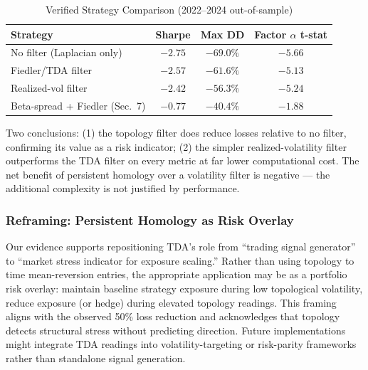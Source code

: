 \begin{table}[H]
\centering
\caption{Verified Strategy Comparison (2022--2024 out-of-sample)}
\label{tab:verified-comparison}
\begin{tabular}{@{}lccc@{}}
\toprule
\textbf{Strategy} & \textbf{Sharpe} & \textbf{Max DD} & \textbf{Factor $\alpha$ t-stat} \\
\midrule
No filter (Laplacian only)      & $-2.75$ & $-69.0\%$ & $-5.66$ \\
Fiedler/TDA filter              & $-2.57$ & $-61.6\%$ & $-5.13$ \\
Realized-vol filter             & $-2.42$ & $-56.3\%$ & $-5.24$ \\
Beta-spread + Fiedler (Sec.\ 7) & $-0.77$ & $-40.4\%$ & $-1.88$ \\
\bottomrule
\end{tabular}
\end{table}

Two conclusions: (1) the topology filter does reduce losses relative to no filter, confirming its value as a risk indicator; (2) the simpler realized-volatility filter outperforms the TDA filter on every metric at far lower computational cost. The net benefit of persistent homology over a volatility filter is negative --- the additional complexity is not justified by performance.

\subsubsection{Reframing: Persistent Homology as Risk Overlay}

Our evidence supports repositioning TDA's role from ``trading signal generator'' to ``market stress indicator for exposure scaling.'' Rather than using topology to time mean-reversion entries, the appropriate application may be as a portfolio risk overlay: maintain baseline strategy exposure during low topological volatility, reduce exposure (or hedge) during elevated topology readings. This framing aligns with the observed 50\% loss reduction and acknowledges that topology detects structural stress without predicting direction. Future implementations might integrate TDA readings into volatility-targeting or risk-parity frameworks rather than standalone signal generation.
